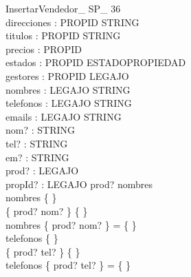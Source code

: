 \documentclass[12pt]{article}
\begin{document}
\begin{schema}{InsertarVendedor\_ SP\_ 36}\\
 direcciones : PROPID \pfun STRING \\
 titulos : PROPID \pfun STRING \\
 precios : PROPID \pfun \nat \\
 estados : PROPID \pfun ESTADOPROPIEDAD \\
 gestores : PROPID \pfun LEGAJO \\
 nombres : LEGAJO \pfun STRING \\
 telefonos : LEGAJO \pfun STRING \\
 emails : LEGAJO \pfun STRING \\
 nom? : STRING \\
 tel? : STRING \\
 em? : STRING \\
 prod? : LEGAJO \\
 propId? : LEGAJO 
\where
 prod? \notin \dom nombres \\
 nombres \neq \{ \} \\
 \{ prod? \mapsto nom? \} \neq \{ \} \\
 nombres \cap \{ prod? \mapsto nom? \} = \{ \} \\
 telefonos \neq \{ \} \\
 \{ prod? \mapsto tel? \} \neq \{ \} \\
 telefonos \cap \{ prod? \mapsto tel? \} = \{ \}
\end{schema}
\end{document}
